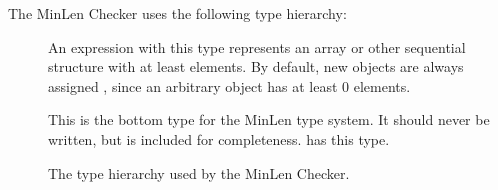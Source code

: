 The MinLen Checker uses the following type hierarchy:

\begin{description}
\item[]
  An expression with this type represents an array or other sequential structure
  with at least  elements. By default, new objects are always
  assigned , since an arbitrary object has at least 0 elements.
\item[]
  This is the bottom type for the MinLen type system. It should
  never be written, but is included for completeness.  has
  this type.
  \end{description}

\begin{figure}
  \caption{The type hierarchy used by the MinLen Checker.}
  \label{fig-minlen-types}
\end{figure}
